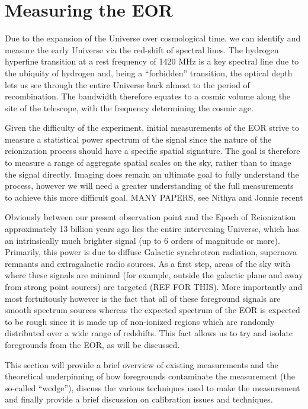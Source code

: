 \documentclass[preprint,11pt]{aastex}
\begin{document}
\section{Measuring the EOR}
\label{sec:eormeas}
Due to the expansion of the Universe over cosmological time, we can identify and measure the early Universe via the red-shift of spectral lines.  The hydrogen hyperfine transition at a rest frequency of 1420 MHz is a key spectral line due to the ubiquity of hydrogen and, being a ``forbidden'' transition, the optical depth lets us see through the entire Universe back almost to the period of recombination.  The bandwidth
therefore equates to a cosmic volume along the site of the telescope, with the frequency determining the cosmic age.

Given the difficulty of the experiment, initial measurements of the EOR strive to measure a statistical power spectrum of the signal since the nature of the reionization process should have a specific spatial signature.  The goal is therefore to measure a range of aggregate spatial scales on the sky, rather than to image the signal directly.  Imaging does remain an ultimate goal to fully understand the process, however we will need a greater understanding of the full measurements to achieve this more difficult goal.  MANY PAPERS, see Nithya and Jonnie recent

Obviously between our present observation point and the Epoch of Reionization approximately 13 billion years ago lies the entire intervening Universe, which has an intrinsically much brighter signal (up to 6 orders of magnitude or more).  Primarily, this power is due to diffuse Galactic synchrotron radiation, supernova remnants and extragalactic radio sources.  As a first step, areas of the sky with where these signals are minimal (for example, outside the galactic plane and away from strong point sources) are targeted (REF FOR THIS).  More importantly and most fortuitously however is the fact that all of these foreground signals are smooth spectrum sources whereas the expected spectrum of the EOR is expected to be rough since it is made up of non-ionized regions which are randomly distributed over a wide range of redshifts.  This fact allows us to try and isolate foregrounds from the EOR, as will be discussed.

This section will provide a brief overview of existing measurements and the theoretical underpinning of how foregrounds contaminate the measurement (the so-called ``wedge''), discuss the various techniques used to make the measurement and finally provide a brief discussion on calibration issues and techniques.
\end{document}
